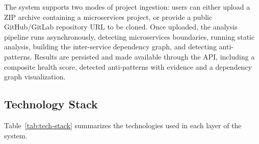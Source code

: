 The system supports two modes of project ingestion: users can either upload a ZIP archive containing a microservices project, or provide a public GitHub/GitLab repository URL to be cloned. Once uploaded, the analysis pipeline runs asynchronously, detecting microservices boundaries, running static analysis, building the inter-service dependency graph, and detecting anti-patterns. Results are persisted and made available through the API, including a composite health score, detected anti-patterns with evidence and a dependency graph visualization.

\subsection{Technology Stack}
\label{subsec:tech-stack}

Table~\ref{tab:tech-stack} summarizes the technologies used in each layer of the system.

